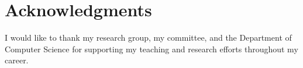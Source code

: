 \documentclass[12pt,letterpaper]{lsuetd}
\begin{document}
\chapter*{Acknowledgments}
\doublespacing
\vspace{0.55ex}

I would like to thank my research group, my committee, and the Department of
Computer Science for supporting my teaching and research efforts throughout
my career.

\pagebreak


\singlespacing
\tableofcontents
\pagebreak

\renewcommand\@pnumwidth{1.55em}
\renewcommand\@tocrmarg{8.55em}
\listoftables
\pagebreak
\listoffigures
\pagebreak

\end{document}
